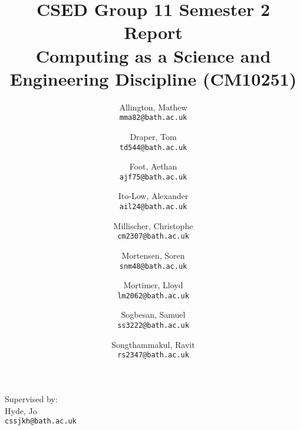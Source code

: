 \documentclass[a4paper,10pt]{article}
\title{%
  CSED Group 11 Semester 2 Report \\
  \vspace{0.5em}
  \Large Computing as a Science and Engineering Discipline (CM10251)
}
\author{%
  Allington, Mathew \\
  \texttt{mma82@bath.ac.uk}
  \and
  Draper, Tom \\
  \texttt{td544@bath.ac.uk}
  \and
  Foot, Aethan \\
  \texttt{ajf75@bath.ac.uk}
  \and
  Ito-Low, Alexander \\
  \texttt{ail24@bath.ac.uk}
  \and
  Millischer, Christophe \\
  \texttt{cm2307@bath.ac.uk}
  \and
  Mortensen, Soren \\
  \texttt{snm48@bath.ac.uk}
  \and
  Mortimer, Lloyd \\
  \texttt{lm2062@bath.ac.uk}
  \and
  Sogbesan, Samuel \\
  \texttt{ss3222@bath.ac.uk}
  \and
  Songthammakul, Ravit \\
  \texttt{rs2347@bath.ac.uk}
}
\date{}
\begin{document}
\maketitle
\begin{abstract}
\end{abstract}

\vfill

\begin{center}
  \large Supervised by: \\
  \vspace{0.5em}
  Hyde, Jo \\
  \texttt{cssjkh@bath.ac.uk}
\end{center}

\newpage
\tableofcontents

\newpage

% 
% 
% 


% 

%   
%   
%   
\end{document}
